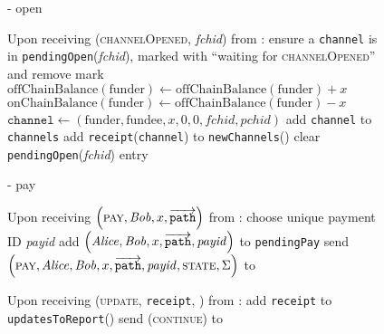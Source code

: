 \begin{figure}[H]
\begin{systembox}{\fpaynet{} - open}
\begin{algorithmic}[1]
        \State Upon receiving (\textsc{channelOpened}, \textit{fchid}) from
        \simulator:
        \Indent
          \State ensure a \texttt{channel} is in
          \texttt{pendingOpen}(\textit{fchid}), marked with ``waiting for
          \textsc{channelOpened}'' and remove mark
          \State $\mathrm{offChainBalance}\left(\mathrm{funder}\right) \gets
          \mathrm{offChainBalance}\left(\mathrm{funder}\right) + x$
          \State $\mathrm{onChainBalance}\left(\mathrm{funder}\right) \gets
          \mathrm{offChainBalance}\left(\mathrm{funder}\right) - x$
          \State $\mathtt{channel} \gets \left(\mathrm{funder}, \mathrm{fundee},
          x, 0, 0, \mathit{fchid}, \mathit{pchid}\right)$
          \State add \texttt{channel} to \texttt{channels}
          \State add \texttt{receipt}(\texttt{channel}) to
          \texttt{newChannels}(\alice)
          \label{alg:fpaynet:channelOpened:report}
          \State clear \texttt{pendingOpen}(\textit{fchid}) entry
        \EndIndent
      \end{algorithmic}
    \end{systembox}
    \caption{}
    \label{alg:fpaynet:open}
  \end{figure}

  \begin{figure}[H]
    \begin{systembox}{\fpaynet{} - pay}
      \begin{algorithmic}[1]
        \State Upon receiving $\left(\textsc{pay}, \mathit{Bob}, x,
        \overrightarrow{\mathtt{path}}\right)$ from \alice:
        \Indent
          \State choose unique payment ID \textit{payid}
          \State add $\left(\mathit{Alice}, \mathit{Bob}, x, \overrightarrow{\mathtt{path}},
          \mathit{payid}\right)$ to \texttt{pendingPay}
          \State send $\left(\textsc{pay}, \mathit{Alice}, \mathit{Bob}, x,
          \overrightarrow{\mathtt{path}}, \mathit{payid}, \textsc{state},
          \Sigma\right)$ to \simulator
          \label{alg:fpaynet:pay:send}
        \EndIndent
        \Statex

        \State Upon receiving (\textsc{update}, \texttt{receipt}, \alice) from
        \simulator:
        \Indent
          \State add \texttt{receipt} to \texttt{updatesToReport}(\alice)
          \label{alg:fpaynet:update}
          \State send (\textsc{continue}) to \simulator
        \EndIndent
      \end{algorithmic}
    \end{systembox}
    \caption{}
    \label{alg:fpaynet:pay}
  \end{figure}

